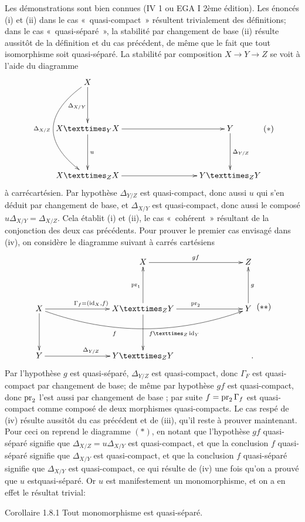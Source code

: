 \documentclass[10pt]{../fichiers-configuration-latex/smfart}
\begin{document}
Les démonstrations sont bien connues (\Cf \EGA IV 1 ou EGA I 2ème
édition). Les énoncés (i) et (ii) dans le cas « quasi-compact »
résultent trivialement des définitions; dans le cas
« quasi-séparé », la stabilité par changement de base (ii) résulte aussitôt de la
définition et du cas précédent, de même que le fait que tout
isomorphisme soit quasi-séparé. La stabilité par composition $X \to
Y \to Z$ se voit à l'aide du diagramme
\[\vcenter{
\xymatrix@R=1.5cm@C=1.5cm{
X \ar[d] \ar@/_3.5pc/[dd]^(.2){\Delta_{X/Y}}_{\Delta_{X/Z}}&\\
\fprod{X}{X}{Y} \ar[d]^{u} \ar[rr]&  &Y \ar[d]^{\Delta_{Y/Z}}\\
\fprod{X}{X}{Z}  \ar[rr]&        & \fprod{Y}{Y}{Z}
}}\leqno{(*)}
\]
à carré\pageoriginale cartésien. Par hypothèse $\Delta_{Y/Z}$ est
quasi-compact, donc aussi $u$ qui s'en déduit par changement de
base, et $\Delta_{X/Y}$ est quasi-compact, donc aussi le composé $u
\Delta_{X/Y} = \Delta_{X/Z}$. Cela établit (i) et (ii), le cas « cohérent » résultant de la conjonction des deux cas précédents.
Pour prouver le premier cas envisagé dans (iv), on considère le
diagramme suivant à carrés cartésiens
\[\vcenter{
\xymatrix@C=2.75cm@R=1.5cm{
  &     X \ar[r]^{gf}          & Z\\
  X \ar[r]^{\Gamma_f=(\id_X,f)}  \ar[d]
  \ar@/_2pc/[rr]_(.55){f\qquad\qquad \fprod{f}{\id_{Y}}{Z}}  &\fprod{X}{Y}{Z} \ar[r]^{\pr_2}\ar[d]\ar[u]^{\pr_1}& Y\ar[u]_{g}\\
Y \ar[r]^{\Delta_{Y/Z}}&  \fprod{Y}{Y}{Z}& \quad .
}}\leqno{(**)}
\]
Par l'hypothèse $g$ est quasi-séparé, $\Delta_{Y/Z}$ est
quasi-compact, donc $\Gamma_F$ est quasi-compact par changement de
base; de même par hypothèse $gf$ est quasi-compact, donc $\operatorname{pr}_2$ l'est
aussi par changement de base ; par suite $f = \operatorname{pr}_2 \Gamma_f$ est
quasi-compact comme composé de deux morphismes quasi-compacts. Le cas
respé de (iv) résulte aussitôt du cas précédent et de (iii), qu'il
reste à prouver maintenant. Pour ceci on reprend le diagramme
$(\ast)$, en notant que l'hypothèse $gf$ quasi-séparé signifie que
$\Delta_{X/Z} = u \Delta_{X/Y}$ est quasi-compact, et que la
conclusion $f$ quasi-séparé signifie que $\Delta_{X/Y}$ est
quasi-compact, et que la conclusion $f$ quasi-séparé signifie que
$\Delta_{X/Y}$ est quasi-compact, ce qui résulte de (iv) une fois
qu'on a prouvé que $u$ est\pageoriginale quasi-séparé. Or $u$ est
manifestement un
monomorphisme, et on a en effet le résultat trivial:

\begin{enonce*}{Corollaire 1.8.1}
Tout monomorphisme est quasi-séparé.
\end{enonce*}
\end{document}
